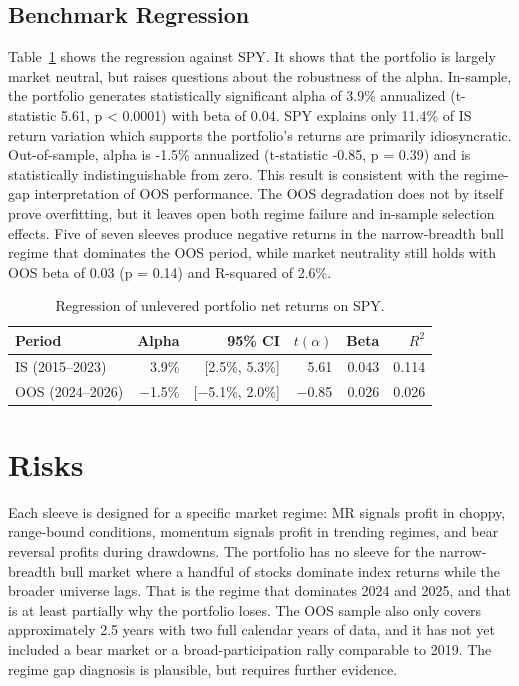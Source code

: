 \documentclass{article}
\begin{document}
\subsection{Benchmark Regression}

Table~\ref{tab:portfolio-regression} shows the regression against SPY. It shows that the portfolio is largely market neutral, but raises questions about the robustness of the alpha. In-sample, the portfolio generates statistically significant alpha of 3.9\% annualized (t-statistic 5.61, p < 0.0001) with beta of 0.04. SPY explains only 11.4\% of IS return variation which supports the portfolio's returns are primarily idiosyncratic. Out-of-sample, alpha is -1.5\% annualized (t-statistic -0.85, p = 0.39) and is statistically indistinguishable from zero. This result is consistent with the regime-gap interpretation of OOS performance. The OOS degradation does not by itself prove overfitting, but it leaves open both regime failure and in-sample selection effects. Five of seven sleeves produce negative returns in the narrow-breadth bull regime that dominates the OOS period, while market neutrality still holds with OOS beta of 0.03 (p = 0.14) and R-squared of 2.6\%.

\begin{table}[htbp]
    \centering
    \small
    \begin{tabular}{lrrrrr}
        \toprule
        Period & Alpha & 95\% CI & $t(\alpha)$ & Beta & $R^2$ \\
        \midrule
        IS (2015--2023)  & 3.9\% & [2.5\%, 5.3\%] &  5.61 & 0.043 & 0.114 \\
        OOS (2024--2026) & $-$1.5\% & [$-$5.1\%, 2.0\%] & $-$0.85 & 0.026 & 0.026 \\
        \bottomrule
    \end{tabular}
    \caption{Regression of unlevered portfolio net returns on SPY.}
    \label{tab:portfolio-regression}
\end{table}

\section{Risks}

Each sleeve is designed for a specific market regime: MR signals profit in choppy, range-bound conditions, momentum signals profit in trending regimes, and bear reversal profits during drawdowns. The portfolio has no sleeve for the narrow-breadth bull market where a handful of stocks dominate index returns while the broader universe lags. That is the regime that dominates 2024 and 2025, and that is at least partially why the portfolio loses. The OOS sample also only covers approximately 2.5 years with two full calendar years of data, and it has not yet included a bear market or a broad-participation rally comparable to 2019. The regime gap diagnosis is plausible, but requires further evidence.
\end{document}
